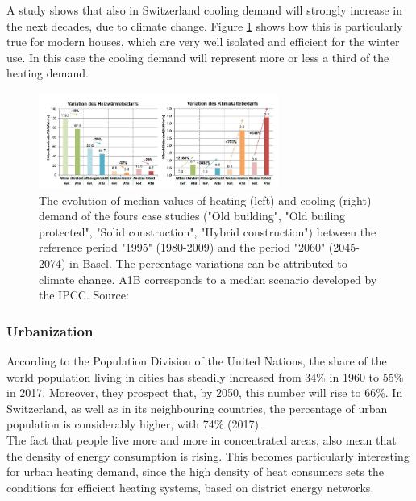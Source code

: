 \documentclass{article}
\begin{document}
A study shows that also in Switzerland cooling demand will strongly increase in the next decades, due to climate change. Figure \ref{fig:climat_CH} shows how this is particularly true for modern houses, which are very well isolated and efficient for the winter use. In this case the cooling demand will represent more or less a third of the heating demand\cite{hsluClimaBauPlanenAngesichts2017}.\\

\begin{figure}[h!]
\centering
\includegraphics[width=0.7\textwidth]{climat_CH.JPG}
\caption{The evolution of median values of heating (left) and cooling (right) demand of the fours case studies ("Old building", "Old builing protected", "Solid construction", "Hybrid construction") between the reference period "1995" (1980-2009) and the period "2060" (2045-2074) in Basel. The percentage variations can be attributed to climate change. A1B corresponds to a median scenario developed by the IPCC. Source: \cite{hsluClimaBauPlanenAngesichts2017}}
\label{fig:climat_CH}
\end{figure}

\subsubsection{Urbanization}
According to the Population Division of the United Nations, the share of the world population living in cities has steadily increased from 34\% in 1960 to 55\% in 2017. Moreover, they prospect that, by 2050, this number will rise to 66\%. In Switzerland, as well as in its neighbouring countries, the percentage of urban population is considerably higher, with 74\% (2017) \cite{unitednationspopulationdivisionWorldUrbanizationProspects}.\\

The fact that people live more and more in concentrated areas, also mean that the density of energy consumption is rising. This becomes particularly interesting for urban heating demand, since the high density of heat consumers sets the conditions for efficient heating systems, based on district energy networks.
\end{document}
